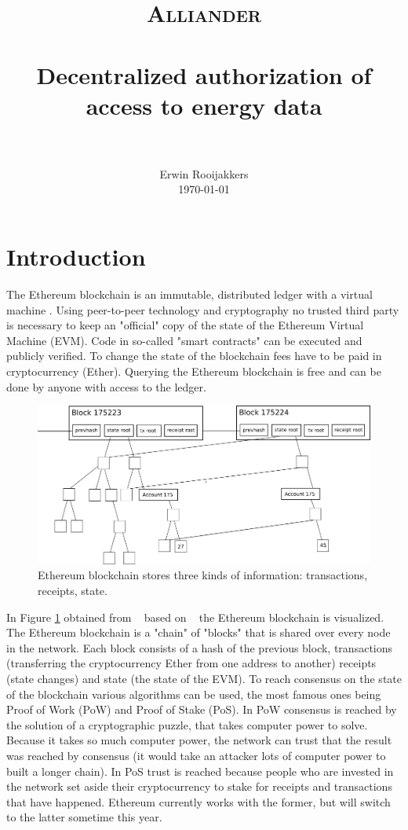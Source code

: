 \documentclass[paper=a4, fontsize=11pt]{scrartcl}
\title{
  \usefont{OT1}{bch}{b}{n}
  \normalfont \normalsize \textsc{Alliander} \\ [25pt]
  \horrule{0.5pt} \\[0.4cm]
  \huge Decentralized authorization of access to energy data \\
  \horrule{2pt} \\[0.5cm]
}
\author{
\normalfont \normalsize
Erwin Rooijakkers\\[-3pt] \normalsize
\today
}
\date{}
\numberwithin{equation}{section} %
\numberwithin{figure}{section}   %
\numberwithin{table}{section}    %
\begin{document}
\maketitle

\section{Introduction}


The Ethereum blockchain is an immutable, distributed ledger with a virtual
machine \cite{ethereum}. Using peer-to-peer technology and cryptography no
trusted third party is necessary to keep an "official" copy of the state of the
Ethereum Virtual Machine (EVM). Code in so-called "smart contracts" can be
executed and publicly verified. To change the state of the blockchain fees have
to be paid in cryptocurrency (Ether). Querying the Ethereum blockchain is free
and can be done by anyone with access to the ledger.\\

\begin{figure}[h]
  \centering
  \includegraphics[width=\textwidth]{ethblockchain_full}
  \caption{Ethereum blockchain stores three kinds of information: transactions, receipts, state.}
  \label{fig:ethblockchain_full}
\end{figure}

In Figure \ref{fig:ethblockchain_full} obtained from ~\cite{ethereum} based on
~\cite{bitcoin} the Ethereum blockchain is visualized. The Ethereum blockchain
is a "chain" of "blocks" that is shared over every node in the network. Each
block consists of a hash of the previous block, transactions (transferring the
cryptocurrency Ether from one address to another) receipts (state changes) and
state (the state of the EVM). To reach consensus on the state of the blockchain
various algorithms can be used, the most famous ones being Proof of Work (PoW)
and Proof of Stake (PoS). In PoW consensus is reached by the solution of a
cryptographic puzzle, that takes computer power to solve. Because it takes so
much computer power, the network can trust that the result was reached by
consensus (it would take an attacker lots of computer power to built a longer
chain). In PoS trust is reached because people who are invested in the network
set aside their cryptocurrency to stake for receipts and transactions that have
happened. Ethereum currently works with the former, but will switch to the
latter sometime this year.\\
\end{document}
